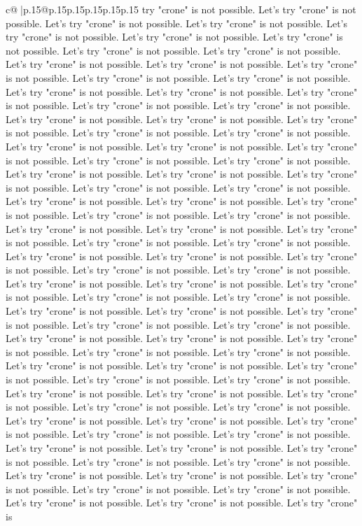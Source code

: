 \documentclass{article}
\begin{document}
{\begin{supertabular}{c@{$\;$}|p{.15\linewidth}@{}p{.15\linewidth}p{.15\linewidth}p{.15\linewidth}p{.15\linewidth}p{.15\linewidth}}
{{{try "crone" is not possible. Let's try "crone" is not possible. Let's try "crone" is not possible. Let's try "crone" is not possible. Let's try "crone" is not possible. Let's try "crone" is not possible. Let's try "crone" is not possible. Let's try "crone" is not possible. Let's try "crone" is not possible. Let's try "crone" is not possible. Let's try "crone" is not possible. Let's try "crone" is not possible. Let's try "crone" is not possible. Let's try "crone" is not possible. Let's try "crone" is not possible. Let's try "crone" is not possible. Let's try "crone" is not possible. Let's try "crone" is not possible. Let's try "crone" is not possible. Let's try "crone" is not possible. Let's try "crone" is not possible. Let's try "crone" is not possible. Let's try "crone" is not possible. Let's try "crone" is not possible. Let's try "crone" is not possible. Let's try "crone" is not possible. Let's try "crone" is not possible. Let's try "crone" is not possible. Let's try "crone" is not possible. Let's try "crone" is not possible. Let's try "crone" is not possible. Let's try "crone" is not possible. Let's try "crone" is not possible. Let's try "crone" is not possible. Let's try "crone" is not possible. Let's try "crone" is not possible. Let's try "crone" is not possible. Let's try "crone" is not possible. Let's try "crone" is not possible. Let's try "crone" is not possible. Let's try "crone" is not possible. Let's try "crone" is not possible. Let's try "crone" is not possible. Let's try "crone" is not possible. Let's try "crone" is not possible. Let's try "crone" is not possible. Let's try "crone" is not possible. Let's try "crone" is not possible. Let's try "crone" is not possible. Let's try "crone" is not possible. Let's try "crone" is not possible. Let's try "crone" is not possible. Let's try "crone" is not possible. Let's try "crone" is not possible. Let's try "crone" is not possible. Let's try "crone" is not possible. Let's try "crone" is not possible. Let's try "crone" is not possible. Let's try "crone" is not possible. Let's try "crone" is not possible. Let's try "crone" is not possible. Let's try "crone" is not possible. Let's try "crone" is not possible. Let's try "crone" is not possible. Let's try "crone" is not possible. Let's try "crone" is not possible. Let's try "crone" is not possible. Let's try "crone" is not possible. Let's try "crone" is not possible. Let's try "crone" is not possible. Let's try "crone" is not possible. Let's try "crone" is not possible. Let's try "crone" is not possible. Let's try "crone" is not possible. Let's try "crone" is not possible. Let's try "crone" is not possible. Let's try "crone" is not possible. Let's try "crone" is not possible. Let's try "crone" is not possible. Let's try "crone" is not possible. Let's try "crone" is not possible. Let's try "crone" is not possible. Let's try "crone" is not possible. Let's try "crone" is not possible. Let's try "crone" is not possible. Let's try "crone" is not possible. Let's try "crone" is not possible. Let's try "crone" is not possible. Let's try "crone" is not possible. Let's try "crone" is not possible. Let's try "crone" is not possible. Let's try "crone" is }}}
\end{supertabular}}
\end{document}
